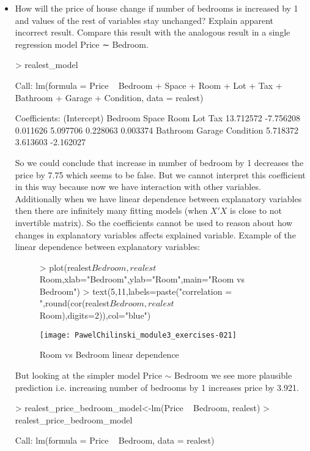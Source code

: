 \documentclass[a4paper]{article}
\begin{document}
\begin{itemize}
\item How will the price of house change if number of bedrooms is increased by 1 and values of the rest of variables stay unchanged? Explain apparent incorrect result. Compare this result with the analogous result in a single regression model Price ∼ Bedroom.
\begin{Schunk}
\begin{Sinput}
> realest_model
\end{Sinput}
\begin{Soutput}
Call:
lm(formula = Price ~ Bedroom + Space + Room + Lot + Tax + Bathroom + 
    Garage + Condition, data = realest)

Coefficients:
(Intercept)      Bedroom        Space         Room          Lot          Tax  
  13.712572    -7.756208     0.011626     5.097706     0.228063     0.003374  
   Bathroom       Garage    Condition  
   5.718372     3.613603    -2.162027  
\end{Soutput}
\end{Schunk}
So we could conclude that increase in number of bedroom by 1 decreases the price by 7.75 which seems to be false. But we cannot interpret this coefficient in this way because now we have interaction with other variables. Additionally when we have linear dependence between explanatory variables then there are infinitely many fitting models (when $X'X$ is close to not invertible matrix). So the coefficients cannot be used to reason about how changes in explanatory variables affects explained variable. Example
of the linear dependence between explanatory variables:
\begin{figure}[H]
\begin{center}
\begin{Schunk}
\begin{Sinput}
> plot(realest$Bedroom,realest$Room,xlab="Bedroom",ylab="Room",main="Room vs Bedroom")
> text(5,11,labels=paste("correlation = ",round(cor(realest$Bedroom,realest$Room),digits=2)),col="blue")
\end{Sinput}
\end{Schunk}
\texttt{[image: PawelChilinski\_module3\_exercises-021]}
\caption{Room vs Bedroom linear dependence}
\end{center}
\end{figure}
But looking at the simpler model Price $\sim$ Bedroom we see more plausible prediction i.e. increasing number of bedrooms by 1 increases price by 3.921.
\begin{Schunk}
\begin{Sinput}
> realest_price_bedroom_model<-lm(Price ~ Bedroom, realest)
> realest_price_bedroom_model
\end{Sinput}
\begin{Soutput}
Call:
lm(formula = Price ~ Bedroom, data = realest)


\end{Soutput}
\end{Schunk}
\end{itemize}
\end{document}
